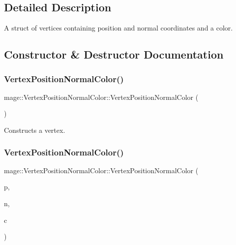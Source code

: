 \subsection{Detailed Description}
A struct of vertices containing position and normal coordinates and a color. 

\subsection{Constructor \& Destructor Documentation}
\hypertarget{structmage_1_1_vertex_position_normal_color_a8c8eff8f2fc3520bec482e89e2b32119}{}\label{structmage_1_1_vertex_position_normal_color_a8c8eff8f2fc3520bec482e89e2b32119} 
\subsubsection{\texorpdfstring{Vertex\+Position\+Normal\+Color()}{VertexPositionNormalColor()}\hspace{0.1cm}{\footnotesize\ttfamily [1/4]}}
{\footnotesize\ttfamily mage\+::\+Vertex\+Position\+Normal\+Color\+::\+Vertex\+Position\+Normal\+Color (\begin{DoxyParamCaption}{ }\end{DoxyParamCaption})\hspace{0.3cm}{\ttfamily [default]}}

Constructs a vertex. \hypertarget{structmage_1_1_vertex_position_normal_color_a68855e1bef5b58c89bf7819eb6903573}{}\label{structmage_1_1_vertex_position_normal_color_a68855e1bef5b58c89bf7819eb6903573} 
\subsubsection{\texorpdfstring{Vertex\+Position\+Normal\+Color()}{VertexPositionNormalColor()}\hspace{0.1cm}{\footnotesize\ttfamily [2/4]}}
{\footnotesize\ttfamily mage\+::\+Vertex\+Position\+Normal\+Color\+::\+Vertex\+Position\+Normal\+Color (\begin{DoxyParamCaption}\item[{const \hyperlink{structmage_1_1_point3}{Point3} \&}]{p,  }\item[{const \hyperlink{structmage_1_1_normal3}{Normal3} \&}]{n,  }\item[{const \hyperlink{structmage_1_1_s_r_g_b_a}{S\+R\+G\+BA} \&}]{c }\end{DoxyParamCaption})\hspace{0.3cm}{\ttfamily [explicit]}}

